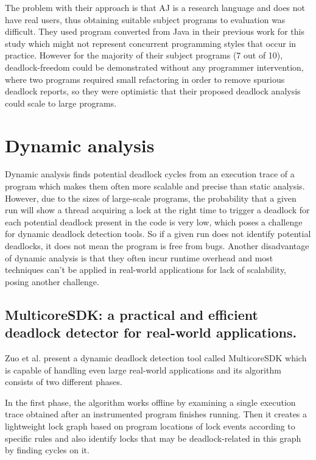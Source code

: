 The problem with their approach is that AJ is a research language and does not have real users, thus obtaining suitable subject programs to evaluation was difficult.
They used program converted from Java in their previous work \cite{dolby} for this study which might not represent concurrent programming styles that occur in practice.
However for the majority of their subject programs (7 out of 10), deadlock-freedom could be demonstrated without any programmer intervention, where two programs required
small refactoring in order to remove spurious deadlock reports, so they were optimistic that their proposed deadlock analysis could scale to large programs.

\section{Dynamic analysis}

Dynamic analysis finds potential deadlock cycles from an execution trace of a program which makes them often more scalable and precise than static analysis.
However, due to the sizes of large-scale programs, the probability that a given run will show a thread acquiring a lock at the right time to trigger a deadlock for
each potential deadlock present in the code is very low, which poses a challenge for dynamic deadlock detection tools. So if a given run does not identify potential
deadlocks, it does not mean the program is free from bugs. Another disadvantage of dynamic analysis is that they often incur runtime overhead and most techniques
can't be applied in real-world applications for lack of scalability, posing another challenge.

\subsection{MulticoreSDK: a practical and efficient deadlock detector for real-world applications.} Zuo et al. \cite{mcsdk}
present a dynamic deadlock detection tool called MulticoreSDK which is capable of handling even large real-world applications and its algorithm consists of two different phases.

In the first phase, the algorithm works offline by examining a single execution trace obtained after an instrumented program finishes running.
Then it creates a lightweight lock graph based on program locations of lock events according to specific rules
and also identify locks that may be deadlock-related in this graph by finding cycles on it.

